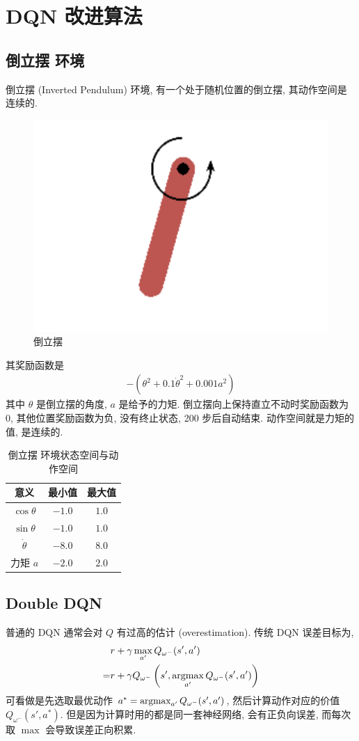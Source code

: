 \newpage
\section{DQN 改进算法}

\subsection{倒立摆 环境}
倒立摆 (Inverted Pendulum) 环境, 有一个处于随机位置的倒立摆, 其动作空间是连续的. 

\begin{figure}[!htb]
    \centering
    \includegraphics[width=0.618\linewidth]{pic/RL8/倒立摆.png}
    \caption{倒立摆}
\end{figure}

其奖励函数是
\begin{align*}
    -(\theta^2 + 0.1 \dot{\theta}^2 +0.001 a^2)
\end{align*}
其中 $\theta$ 是倒立摆的角度, $a$ 是给予的力矩. 倒立摆向上保持直立不动时奖励函数为 0, 其他位置奖励函数为负, 没有终止状态, 200 步后自动结束. 动作空间就是力矩的值, 是连续的. 

\begin{table}[!htb]
    \centering
    \caption{倒立摆 环境状态空间与动作空间}
    \begin{tabular}[c]{ccc}\toprule
        意义 & 最小值 & 最大值 \\ \midrule
        $\cos \theta$ & $-1.0$ & $1.0$ \\
        $\sin \theta$  & $-1.0$ & $1.0$ \\
        $\dot \theta$  & $-8.0$ & $8.0$ \\ \cmidrule{1-1}
        力矩 $a$ & $-2.0$ & $2.0$   \\
        \bottomrule
    \end{tabular}
\end{table}


\subsection{Double DQN}
普通的 DQN 通常会对 $Q$ 有过高的估计 (overestimation). 传统 DQN 误差目标为,
\begin{align*}
    &r+\gamma \max_{a'} Q_{\omega^-} (s', a')\\
    =&r+ \gamma Q_{\omega^-}\left( s', \operatorname*{argmax}_{a'} Q_{\omega^-} (s', a') \right)
\end{align*}
可看做是先选取最优动作 $a^* = \operatorname*{argmax}_{a'} Q_{\omega^-} (s', a')$, 然后计算动作对应的价值 $Q_{\omega^-}(s', a^*)$. 但是因为计算时用的都是同一套神经网络, 会有正负向误差, 而每次取 $\max$ 会导致误差正向积累. 

